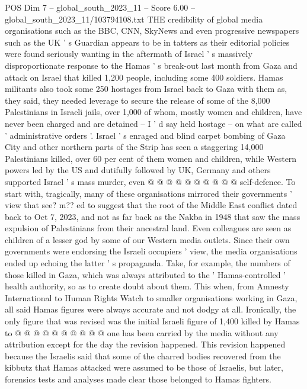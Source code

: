 \begin{textsample}{POS Dim 7 – global\_south\_2023\_11 – Score 6.00 – global\_south\_2023\_11/103794108.txt}  \label{ex:f7_pos_302}
THE credibility of global media organisations such as the BBC, CNN, SkyNews and even progressive newspapers such as the UK ' s Guardian appears to be in tatters as their editorial policies were found seriously wanting in the aftermath of Israel ' s massively disproportionate response to the Hamas ' s break-out last month from Gaza and attack on Israel that killed 1,200 people, including some 400 soldiers.
Hamas militants also took some 250 hostages from Israel back to Gaza with them as, they said, they needed leverage to secure the release of some of the 8,000 Palestinians in Israeli jails, over 1,000 of whom, mostly women and children, have never been charged and are detained -- I ' d say held hostage -- on what are called ' administrative orders '.
Israel ' s enraged and blind carpet bombing of Gaza City and other northern parts of the Strip has seen a staggering 14,000 Palestinians killed, over 60 per cent of them women and children, while Western powers led by the US and dutifully followed by UK, Germany and others supported Israel ' s mass murder, even @ @ @ @ @ @ @ @ @ @ self-defence.
To start with, tragically, many of these organisations mirrored their governments ' view that see? m?? ed to suggest that the root of the Middle East conflict dated back to Oct 7, 2023, and not as far back as the Nakba in 1948 that saw the mass expulsion of Palestinians from their ancestral land.
Even colleagues are seen as children of a lesser god by some of our Western media outlets.
Since their own governments were endorsing the Israeli occupiers ' view, the media organisations ended up echoing the latter ' s propaganda.
Take, for example, the numbers of those killed in Gaza, which was always attributed to the ' Hamas-controlled ' health authority, so as to create doubt about them.
This when, from Amnesty International to Human Rights Watch to smaller organisations working in Gaza, all said Hamas figures were always accurate and not dodgy at all.
Ironically, the only figure that was revised was the initial Israeli figure of 1,400 killed by Hamas to @ @ @ @ @ @ @ @ @ @ one has been carried by the media without any attribution except for the day the revision happened.
This revision happened because the Israelis said that some of the charred bodies recovered from the kibbutz that Hamas attacked were assumed to be those of Israelis, but later, forensics tests and analyses made clear those belonged to Hamas fighters.

\end{textsample}
